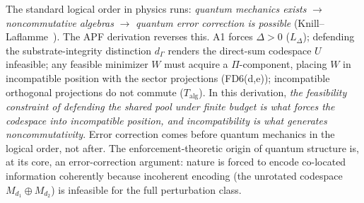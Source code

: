 \documentclass[11pt]{article}
\theoremstyle{remark}
\begin{document}
\begin{tcolorbox}[defbox, title={Definition FD6: Joint Enforcement Operation (from $L_\Pi$)}]
\smallskip\noindent The standard logical order in physics runs: \emph{quantum mechanics exists} $\to$ \emph{noncommutative algebras} $\to$ \emph{quantum error correction is possible} (Knill--Laflamme~\cite{NielsenChuang2000}).  The APF derivation reverses this.  A1 forces $\Delta > 0$ ($L_\Delta$); defending the substrate-integrity distinction $d_\Gamma$ renders the direct-sum codespace $U$ infeasible; any feasible minimizer $W$ must acquire a $\Pi$-component, placing $W$ in incompatible position with the sector projections (FD6(d,e)); incompatible orthogonal projections do not commute ($T_{\mathrm{alg}}$).  In this derivation, \emph{the feasibility constraint of defending the shared pool under finite budget is what forces the codespace into incompatible position, and incompatibility is what generates noncommutativity}.  Error correction comes before quantum mechanics in the logical order, not after.  The enforcement-theoretic origin of quantum structure is, at its core, an error-correction argument: nature is forced to encode co-located information coherently because incoherent encoding (the unrotated codespace $M_{d_1} \oplus M_{d_2}$) is infeasible for the full perturbation class.
\end{tcolorbox}
\end{document}
